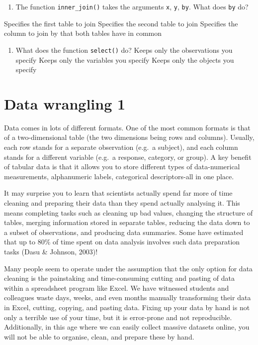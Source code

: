 \documentclass[]{book}
\providecommand{\tightlist}{%
  \setlength{\itemsep}{0pt}\setlength{\parskip}{0pt}}
\begin{document}
\begin{enumerate}
\def\labelenumi{\arabic{enumi}.}
\setcounter{enumi}{1}
\tightlist
\item
  The function \texttt{inner\_join()} takes the arguments \texttt{x}, \texttt{y}, \texttt{by}. What does \texttt{by} do?
\end{enumerate}

 Specifies the first table to join Specifies the second table to join Specifies the column to join by that both tables have in common

\begin{enumerate}
\def\labelenumi{\arabic{enumi}.}
\setcounter{enumi}{2}
\tightlist
\item
  What does the function \texttt{select()} do?
   Keeps only the observations you specify Keeps only the variables you specify Keeps only the objects you specify
\end{enumerate}

\hypertarget{data-wrangling-1}{%
\chapter{Data wrangling 1}\label{data-wrangling-1}}

Data comes in lots of different formats. One of the most common formats is that of a two-dimensional table (the two dimensions being rows and columns). Usually, each row stands for a separate observation (e.g.~a subject), and each column stands for a different variable (e.g.~a response, category, or group). A key benefit of tabular data is that it allows you to store different types of data-numerical measurements, alphanumeric labels, categorical descriptors-all in one place.

It may surprise you to learn that scientists actually spend far more of time cleaning and preparing their data than they spend actually analysing it. This means completing tasks such as cleaning up bad values, changing the structure of tables, merging information stored in separate tables, reducing the data down to a subset of observations, and producing data summaries. Some have estimated that up to 80\% of time spent on data analysis involves such data preparation tasks (Dasu \& Johnson, 2003)!

Many people seem to operate under the assumption that the only option for data cleaning is the painstaking and time-consuming cutting and pasting of data within a spreadsheet program like Excel. We have witnessed students and colleagues waste days, weeks, and even months manually transforming their data in Excel, cutting, copying, and pasting data. Fixing up your data by hand is not only a terrible use of your time, but it is error-prone and not reproducible. Additionally, in this age where we can easily collect massive datasets online, you will not be able to organise, clean, and prepare these by hand.
\end{document}

